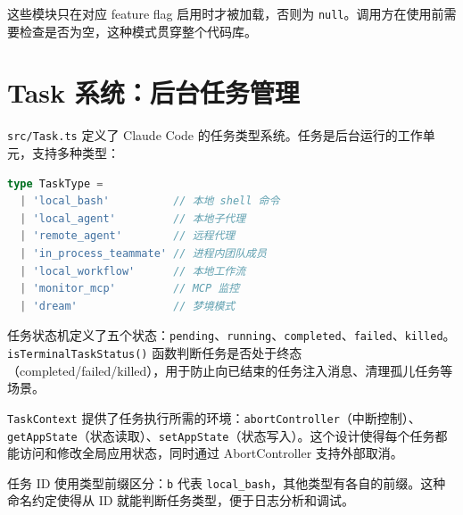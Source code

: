这些模块只在对应 feature flag 启用时才被加载，否则为 \texttt{null}。调用方在使用前需要检查是否为空，这种模式贯穿整个代码库。

\section{Task 系统：后台任务管理}

\texttt{src/Task.ts} 定义了 Claude Code 的任务类型系统。任务是后台运行的工作单元，支持多种类型：

\begin{lstlisting}[language=TypeScript]
type TaskType =
  | 'local_bash'          // 本地 shell 命令
  | 'local_agent'         // 本地子代理
  | 'remote_agent'        // 远程代理
  | 'in_process_teammate' // 进程内团队成员
  | 'local_workflow'      // 本地工作流
  | 'monitor_mcp'         // MCP 监控
  | 'dream'               // 梦境模式
\end{lstlisting}

任务状态机定义了五个状态：\texttt{pending}、\texttt{running}、\texttt{completed}、\texttt{failed}、\texttt{killed}。\texttt{isTerminalTaskStatus()} 函数判断任务是否处于终态（completed/failed/killed），用于防止向已结束的任务注入消息、清理孤儿任务等场景。

\texttt{TaskContext} 提供了任务执行所需的环境：\texttt{abortController}（中断控制）、\texttt{getAppState}（状态读取）、\texttt{setAppState}（状态写入）。这个设计使得每个任务都能访问和修改全局应用状态，同时通过 AbortController 支持外部取消。

任务 ID 使用类型前缀区分：\texttt{b} 代表 \texttt{local\_bash}，其他类型有各自的前缀。这种命名约定使得从 ID 就能判断任务类型，便于日志分析和调试。
